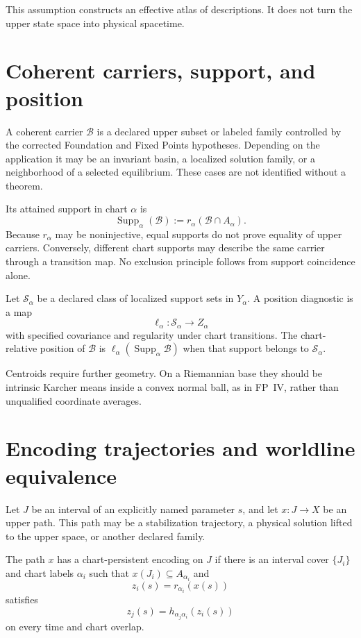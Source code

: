 \documentclass[11pt]{article}
\begin{document}
This assumption constructs an effective atlas of descriptions. It does not
turn the upper state space into physical spacetime.

\section{Coherent carriers, support, and position}

A coherent carrier $\mathcal B$ is a declared upper subset or labeled family
controlled by the corrected Foundation and Fixed Points hypotheses. Depending
on the application it may be an invariant basin, a localized solution family,
or a neighborhood of a selected equilibrium. These cases are not identified
without a theorem.

Its attained support in chart $\alpha$ is
\[
 \operatorname{Supp}_\alpha(\mathcal B)
 :=r_\alpha(\mathcal B\cap A_\alpha).
\]
Because $r_\alpha$ may be noninjective, equal supports do not prove equality of
upper carriers. Conversely, different chart supports may describe the same
carrier through a transition map. No exclusion principle follows from support
coincidence alone.

\begin{definition}
Let $\mathcal S_\alpha$ be a declared class of localized support sets in
$Y_\alpha$. A position diagnostic is a map
\[
 \ell_\alpha:\mathcal S_\alpha\to Z_\alpha
\]
with specified covariance and regularity under chart transitions. The
chart-relative position of $\mathcal B$ is
$\ell_\alpha(\operatorname{Supp}_\alpha\mathcal B)$ when that support belongs
to $\mathcal S_\alpha$.
\end{definition}

Centroids require further geometry. On a Riemannian base they should be
intrinsic Karcher means inside a convex normal ball, as in FP~IV, rather than
unqualified coordinate averages.

\section{Encoding trajectories and worldline equivalence}

Let $J$ be an interval of an explicitly named parameter $s$, and let
$x:J\to X$ be an upper path. This path may be a stabilization trajectory, a
physical solution lifted to the upper space, or another declared family.

\begin{definition}
The path $x$ has a chart-persistent encoding on $J$ if there is an interval
cover $\{J_i\}$ and chart labels $\alpha_i$ such that
$x(J_i)\subseteq A_{\alpha_i}$ and
\[
 z_i(s)=r_{\alpha_i}(x(s))
\]
satisfies
\[
 z_j(s)=h_{\alpha_j\alpha_i}(z_i(s))
\]
on every time and chart overlap.
\end{definition}
\end{document}
